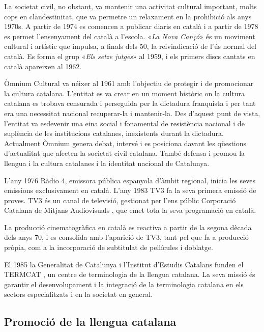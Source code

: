 \begin{multicols}{2}
La societat civil, no obstant, va mantenir una activitat cultural important, molts cops en clandestinitat, que va permetre un relaxament en la prohibició als anys 1970s. A partir de 1974 es comencen a publicar diaris en català i a partir de 1978 es permet l’ensenyament del català a l’escola.  «\textit{La Nova Cançó}» és un moviment cultural i artístic que impulsa, a finals dels 50, la reivindicació de l’ús normal del català. Es forma el grup «\textit{Els setze jutges}» al 1959, i els primers discs cantats en català apareixen al 1962.


Òmnium Cultural \cite{CAT-omniumcultural} va néixer al 1961 amb l’objectiu de protegir i de promocionar la cultura catalana. L’entitat es va crear en un moment històric on la cultura catalana es trobava censurada i perseguida per la dictadura franquista i per tant era una necessitat nacional recuperar-la i mantenir-la. Des d’aquest punt de vista, l’entitat va esdevenir una eina social i fonamental de resistència nacional i de suplència de les institucions catalanes, inexistents durant la dictadura. Actualment Òmnium genera debat, intervé i es posiciona davant les qüestions d’actualitat que afecten la societat civil catalana. També defensa i promou la llengua i la cultura catalanes i la identitat nacional de Catalunya.

L’any 1976 Ràdio 4, emissora pública espanyola d’àmbit regional, inicia les seves emissions exclusivament en català. L’any 1983 TV3 fa la seva primera emissió de proves. TV3 és un canal de televisió, gestionat per l’ens públic Corporació Catalana de Mitjans Audiovisuals \cite{CAT-CCMA}, que emet tota la seva programació en català.

La producció cinematogràfica en català es reactiva a partir de la segona dècada dels anys 70, i es consolida amb l’aparició de TV3, tant pel que fa a producció pròpia, com a la incorporació de subtitulat de peŀlícules i doblatge.

El 1985 la Generalitat de Catalunya i l’Institut d’Estudis Catalans funden el TERMCAT \cite{CAT-TERMCAT}, un centre de terminologia de la llengua catalana. La seva missió és garantir el desenvolupament i la integració de la terminologia catalana en els sectors especialitzats i en la societat en general.

\subsection{Promoció de la llengua catalana}


\end{multicols}
